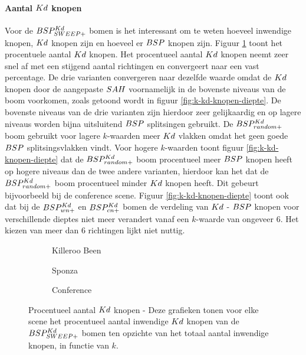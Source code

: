 \paragraph{Aantal $\symKd$ knopen}
Voor de $BSP^{Kd}_{SWEEP+}$ bomen is het interessant om te weten hoeveel inwendige knopen, $\symKd$ knopen zijn en hoeveel er $BSP$ knopen zijn.
Figuur \ref{fig:k-kd-knopen} toont het procentuele aantal $\symKd$ knopen.
Het procentueel aantal $\symKd$ knopen neemt zeer snel af met een stijgend aantal richtingen en convergeert naar een vast percentage.
De drie varianten convergeren naar dezelfde waarde omdat de $\symKd$ knopen door de aangepaste $SAH$ voornamelijk in de bovenste niveaus van de boom voorkomen, zoals getoond wordt in figuur \ref{fig:k-kd-knopen-diepte}.
De bovenste niveaus van de drie varianten zijn hierdoor zeer gelijkaardig en op lagere niveaus worden bijna uitsluitend $BSP$ splitsingen gebruikt.
De $BSP^{Kd}_{random+}$ boom gebruikt voor lagere $k$-waarden meer $\symKd$ vlakken omdat het geen goede $BSP$ splitsingsvlakken vindt.
Voor hogere $k$-waarden toont figuur \ref{fig:k-kd-knopen-diepte} dat de $BSP^{Kd}_{random+}$ boom procentueel meer $BSP$ knopen heeft op hogere niveaus dan de twee andere varianten, hierdoor kan het dat de $BSP^{Kd}_{random+}$ boom procentueel minder $\symKd$ knopen heeft.
Dit gebeurt bijvoorbeeld bij de conference scene.
Figuur \ref{fig:k-kd-knopen-diepte} toont ook dat bij de $BSP^{Kd}_{wn+}$ en $BSP^{Kd}_{cn+}$ bomen de verdeling van $\symKd$ - $BSP$ knopen voor verschillende dieptes niet meer verandert vanaf een $k$-waarde van ongeveer 6.
Het kiezen van meer dan 6 richtingen lijkt niet nuttig.

\begin{figure}[h]
  \centering
  \begin{subfigure}[t]{.32\linewidth}
    \centering
{}
\caption{Killeroo Been}
  \end{subfigure}
  \begin{subfigure}[t]{.32\linewidth}
    \centering
{}
\caption{Sponza}
\end{subfigure}
\begin{subfigure}[t]{.32\linewidth}
  \centering
{}
\caption{Conference}
\end{subfigure}
\caption[Procentueel aantal $\symKd$ knopen]{Procentueel aantal $\symKd$ knopen - \small Deze grafieken tonen voor elke scene het procentueel aantal inwendige $\symKd$ knopen van de $BSP^{Kd}_{SWEEP+}$ bomen ten opzichte van het totaal aantal inwendige knopen, in functie van $k$.}
\label{fig:k-kd-knopen}
\end{figure}

